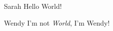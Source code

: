 \begin{bubble}{Sarah}
  Hello World!
\end{bubble}

\begin{bubble}{Wendy}
  I'm not \emph{World}, I'm Wendy!
\end{bubble}
